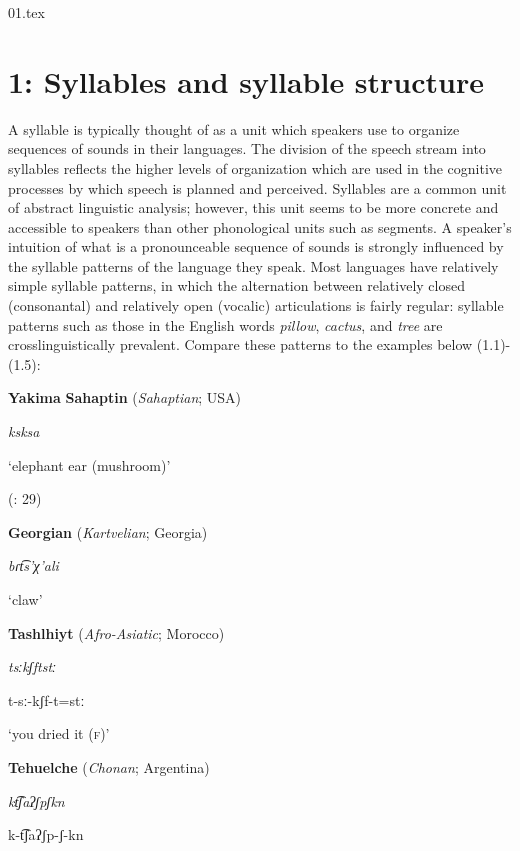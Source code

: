 01.tex
\chapter{1: Syllables and syllable structure}

  A syllable is typically thought of as a unit which speakers use to organize sequences of sounds in their languages. The division of the speech stream into syllables reflects the higher levels of organization which are used in the cognitive processes by which speech is planned and perceived. Syllables are a common unit of abstract linguistic analysis; however, this unit seems to be more concrete and accessible to speakers than other phonological units such as segments. A speaker’s intuition of what is a pronounceable sequence of sounds is strongly influenced by the syllable patterns of the language they speak. Most languages have relatively simple syllable patterns, in which the alternation between relatively closed (consonantal) and relatively open (vocalic) articulations is fairly regular: syllable patterns such as those in the English words \textit{pillow}, \textit{cactus}, and \textit{tree} are crosslinguistically prevalent. Compare these patterns to the examples below (1.1)-(1.5):

\ea\label{ex:(1.1)}
   \textbf{Yakima} \textbf{Sahaptin} (\textit{Sahaptian}; USA)

\textit{ksksa}

‘elephant ear (mushroom)’

(\citealt{HargusBeavert2006}: 29)
\z

\ea\label{ex:(1.2)}
   \textbf{Georgian} (\textit{Kartvelian}; Georgia)

\textit{bɾt͡s’χ’ali}

‘claw’

\citep[204]{Butskhrikidze2002}

\z

\ea\label{ex:(1.3)}
   \textbf{Tashlhiyt} (\textit{Afro-Asiatic}; Morocco)

\textit{tsːkʃftstː}

t-sː-kʃf-t=stː

‘you dried it (\textsc{f})’

\citep[332]{Ridouane2008}

\z

\ea\label{ex:(1.4)}
   \textbf{Tehuelche} (\textit{Chonan}; Argentina)

\textit{kt͡ʃaʔʃpʃkn}

k-t͡ʃaʔʃp-ʃ-kn

